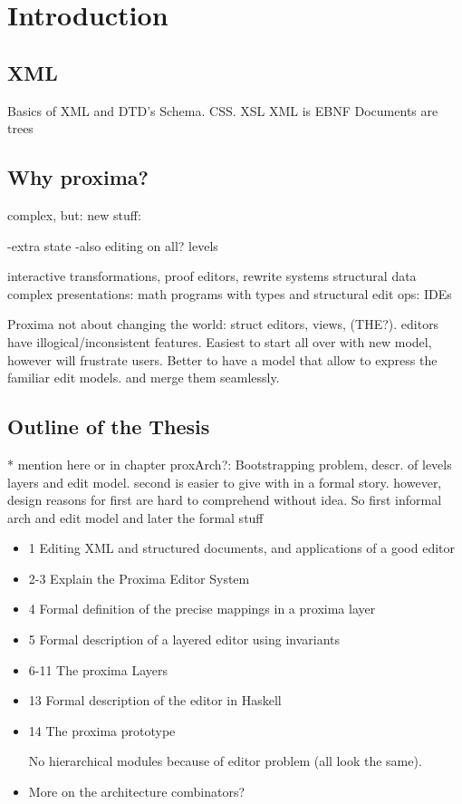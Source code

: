 \chapter{Introduction}
\label{chap:introduction}

\section{XML}
Basics of XML and DTD's  Schema. CSS. XSL
XML is EBNF 
Documents are trees


\section{Why proxima?}

complex, but:
new stuff:

-extra state
-also editing on all? levels


interactive transformations, proof editors, rewrite systems
structural data complex presentations: math
programs with types and structural edit ops: IDEs

Proxima not about changing the world: struct editors, views, (THE?). editors have illogical/inconsistent features. Easiest to start all over with new model, however will frustrate users. Better to have a model that allow to express the familiar edit models. and merge them seamlessly.

\section{Outline of the Thesis}
* mention here or in chapter proxArch?:
Bootstrapping problem, descr. of levels layers and edit model. second is easier to give with in a formal story. however, design reasons for first are hard to comprehend without idea. So first informal arch and edit model and later the formal stuff

\begin{itemize}
\item 1 Editing XML and structured documents, and applications of a good editor
\item 2-3 Explain the Proxima Editor System
\item 4 Formal definition of the precise mappings in a proxima layer
\item 5 Formal description of a layered editor using invariants
\item 6-11 The proxima Layers 



\item 13 Formal description of the editor in Haskell
\item 14 The proxima prototype

No hierarchical modules because of editor problem (all look the same).

\item More on the architecture combinators?

\end{itemize}